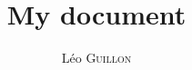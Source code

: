 
\usepackage[utf8]{inputenc}
\usepackage[T1]{fontenc}




\usepackage{graphicx}                       %


\usepackage[french]{babel}                  %




\addto{\captionsfrench}{\renewcommand{\abstractname}{Résumé}}
\addto{\captionsfrench}{\renewcommand{\contentsname}{Sommaire}} %

\newcommand\nom[2]{#1 \textsc{#2}}



\title{My document}
\author{\nom{Léo}{Guillon}}
\date{}

